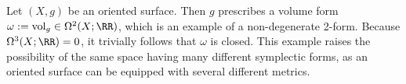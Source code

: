 

    Let $(X, g)$ be an oriented surface.
    Then $g$ prescribes a volume form $\omega:=\text{vol}_g\in \Omega^2(X;\RR)$, which is an example of a non-degenerate 2-form. 
    Because $\Omega^3(X;\RR)=0$, it trivially follows that $\omega$ is closed. 
    This example raises the possibility of the same space having many different symplectic forms, as an oriented surface can be equipped with several different metrics.

